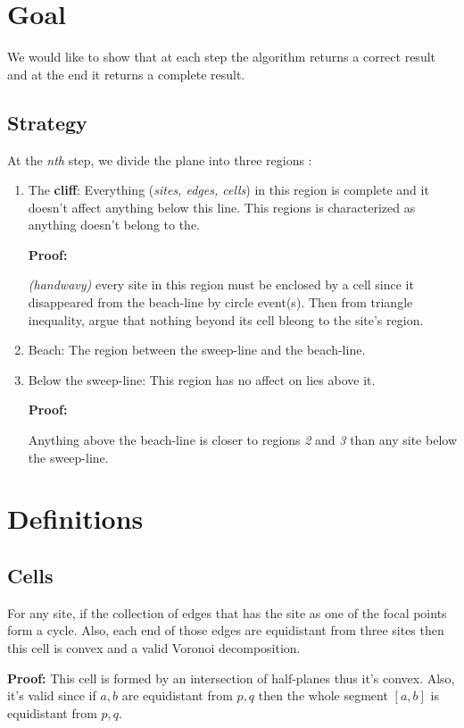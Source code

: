 \documentclass{article}
\begin{document}
\section{Goal}
We would like to show that at each step the algorithm returns a correct result and at the end it returns a complete result.
\subsection{Strategy}
At the \textit{nth} step, we divide the plane into three regions :
\begin{enumerate}
    \item The \textbf{cliff}: Everything (\textit{sites, edges, cells}) in this region is complete and it doesn't affect anything below this line. This regions is characterized as anything doesn't belong to the. 
    
    \textbf{Proof:}
    
    {\color{red} \textit{(handwavy)}} every site in this region must be enclosed by a cell since it disappeared from the beach-line by circle event(s). Then from triangle inequality, argue that nothing beyond its cell bleong to the site's region.
    
    \item Beach: The region between the sweep-line and the beach-line.
    \item Below the sweep-line: This region has no affect on lies above it.
    
    \textbf{Proof:}
    
    Anything above the beach-line is closer to regions \textit{2} and \textit{3} than any site below the sweep-line.
    
\end{enumerate}

\section{Definitions}

\subsection{Cells} For any site, if the collection of edges that has the site as one of the focal points form a cycle. Also, each end of those edges are equidistant from three sites then this cell is convex and a valid Voronoi decomposition.

\textbf{Proof:}
    This cell is formed by an intersection of half-planes thus it's convex. Also, it's valid since if $a, b$ are equidistant from $p, q$ then the whole segment $[a, b]$ is equidistant  from $p, q$. %
    
\end{document}
